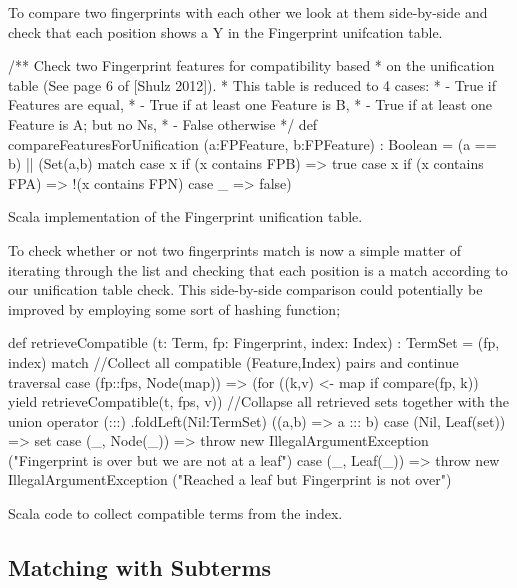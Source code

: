 To compare two fingerprints with each other we look at them side-by-side and check
that each position shows a Y in the Fingerprint unifcation table. 
\begin{listing}[H]
\begin{scalacode}
 /** Check two Fingerprint features for compatibility based
   * on the unification table (See page 6 of [Shulz 2012]).
   * This table is reduced to 4 cases:
   *  - True if Features are equal,
   *  - True if at least one Feature is B,
   *  - True if at least one Feature is A; but no Ns,
   *  - False otherwise  */
  def compareFeaturesForUnification
         (a:FPFeature, b:FPFeature) : Boolean =
  (a == b) || 
  (Set(a,b) match {
    case x if (x contains FPB) => true
    case x if (x contains FPA) => !(x contains FPN)
    case _ => false})
\end{scalacode}
\caption{Scala implementation of the Fingerprint unification table. \protect\cite[p6]{shulz12}}
\label{lst:unitable}
\end{listing}

To check whether or not two fingerprints match is now a simple matter of iterating
through the list and checking that each position is a match according to our unification
table check. This side-by-side comparison could potentially be improved by employing
some sort of hashing function; 

\begin{listing}[H]
\begin{scalacode}
def retrieveCompatible
  (t: Term, fp: Fingerprint, index: Index) : TermSet =
  (fp, index) match {
//Collect all compatible (Feature,Index) pairs and continue traversal
    case (fp::fps, Node(map)) => (for ((k,v) <- map if compare(fp, k))
        yield retrieveCompatible(t, fps, v))
//Collapse all retrieved sets together with the union operator (:::)
      .foldLeft(Nil:TermSet) ((a,b) => a ::: b)
    case (Nil, Leaf(set)) => set
    case (_, Node(_)) => throw new IllegalArgumentException
         ("Fingerprint is over but we are not at a leaf")
    case (_, Leaf(_)) => throw new IllegalArgumentException
         ("Reached a leaf but Fingerprint is not over")
  }
\end{scalacode}
\caption{Scala code to collect compatible terms from the index.}
\label{lst:retrieve}
\end{listing}

\subsection{Matching with Subterms}

